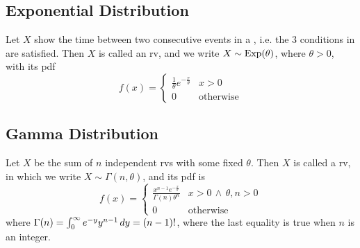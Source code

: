 \documentclass[notoc,notitlepage]{tufte-book}
\begin{document}

\subsection{Exponential Distribution}
\label{sub:exponential_distribution}

\begin{defn}[Exponential RV]\label{defn:exponential_rv}
  Let $X$ show the time between two consecutive events in a , i.e. the 3 conditions in  are satisfied. Then $X$ is called an  rv, and we write $X \sim \operatorname{Exp}(\theta)$, where $\theta > 0$, with its pdf
  \begin{equation*}
    f(x) = \begin{cases} 
      \frac{1}{\theta} e^{- \frac{x}{\theta}} & x > 0 \\
      0                                       & \text{otherwise}
    \end{cases}
  \end{equation*}
\end{defn}


\subsection{Gamma Distribution}
\label{sub:gamma_distribution}

\begin{defn}[Gamma RV]\label{defn:gamma_rv}
  Let $X$ be the sum of $n$ independent  rvs with some fixed $\theta$. Then $X$ is called a  rv, in which we write $X \sim \Gamma(n, \theta)$, and its pdf is
  \begin{equation*}
    f(x) = \begin{cases} 
      \frac{x^{n - 1} e^{- \frac{x}{\theta}}}{\Gamma(n) \theta^n} & x > 0 \, \land \, \theta, n > 0 \\
      0                                                           & \text{otherwise}
    \end{cases}
  \end{equation*}
  where $\Gamma(n) = \int_{0}^{\infty} e^{-y} y^{n - 1} \mathop{}\!d{y} = (n - 1)!$, where the last equality is true when $n$ is an integer.
\end{defn}
\end{document}

